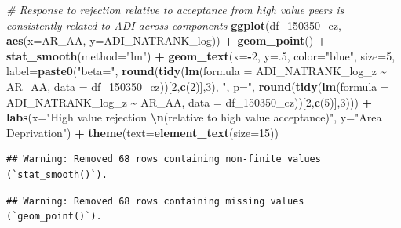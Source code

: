 \documentclass[
]{article}
\newenvironment{Shaded}{\begin{snugshade}}{\end{snugshade}}
\newcommand{\AttributeTok}[1]{\textcolor[rgb]{0.13,0.29,0.53}{#1}}
\newcommand{\CommentTok}[1]{\textcolor[rgb]{0.56,0.35,0.01}{\textit{#1}}}
\newcommand{\DecValTok}[1]{\textcolor[rgb]{0.00,0.00,0.81}{#1}}
\newcommand{\FunctionTok}[1]{\textcolor[rgb]{0.13,0.29,0.53}{\textbf{#1}}}
\newcommand{\NormalTok}[1]{#1}
\newcommand{\SpecialCharTok}[1]{\textcolor[rgb]{0.81,0.36,0.00}{\textbf{#1}}}
\newcommand{\StringTok}[1]{\textcolor[rgb]{0.31,0.60,0.02}{#1}}
\begin{document}
\begin{Shaded}
\begin{Highlighting}[]
\CommentTok{\# Response to rejection relative to acceptance from high value peers is consistently related to ADI across components}
\FunctionTok{ggplot}\NormalTok{(df\_150350\_cz, }\FunctionTok{aes}\NormalTok{(}\AttributeTok{x=}\NormalTok{AR\_AA, }\AttributeTok{y=}\NormalTok{ADI\_NATRANK\_log)) }\SpecialCharTok{+}
  \FunctionTok{geom\_point}\NormalTok{() }\SpecialCharTok{+}
  \FunctionTok{stat\_smooth}\NormalTok{(}\AttributeTok{method=}\StringTok{"lm"}\NormalTok{) }\SpecialCharTok{+}
  \FunctionTok{geom\_text}\NormalTok{(}\AttributeTok{x=}\SpecialCharTok{{-}}\DecValTok{2}\NormalTok{, }\AttributeTok{y=}\NormalTok{.}\DecValTok{5}\NormalTok{, }\AttributeTok{color=}\StringTok{"blue"}\NormalTok{, }\AttributeTok{size=}\DecValTok{5}\NormalTok{, }\AttributeTok{label=}\FunctionTok{paste0}\NormalTok{(}\StringTok{"beta="}\NormalTok{,}
       \FunctionTok{round}\NormalTok{(}\FunctionTok{tidy}\NormalTok{(}\FunctionTok{lm}\NormalTok{(}\AttributeTok{formula =}\NormalTok{ ADI\_NATRANK\_log\_z }\SpecialCharTok{\textasciitilde{}}\NormalTok{ AR\_AA, }\AttributeTok{data =}\NormalTok{ df\_150350\_cz))[}\DecValTok{2}\NormalTok{,}\FunctionTok{c}\NormalTok{(}\DecValTok{2}\NormalTok{)],}\DecValTok{3}\NormalTok{),}
       \StringTok{", p="}\NormalTok{, }
       \FunctionTok{round}\NormalTok{(}\FunctionTok{tidy}\NormalTok{(}\FunctionTok{lm}\NormalTok{(}\AttributeTok{formula =}\NormalTok{ ADI\_NATRANK\_log\_z }\SpecialCharTok{\textasciitilde{}}\NormalTok{ AR\_AA, }\AttributeTok{data =}\NormalTok{ df\_150350\_cz))[}\DecValTok{2}\NormalTok{,}\FunctionTok{c}\NormalTok{(}\DecValTok{5}\NormalTok{)],}\DecValTok{3}\NormalTok{))) }\SpecialCharTok{+}
  \FunctionTok{labs}\NormalTok{(}\AttributeTok{x=}\StringTok{"High value rejection }\SpecialCharTok{\textbackslash{}n}\StringTok{(relative to high value acceptance)"}\NormalTok{,}
       \AttributeTok{y=}\StringTok{"Area Deprivation"}\NormalTok{) }\SpecialCharTok{+}
  \FunctionTok{theme}\NormalTok{(}\AttributeTok{text=}\FunctionTok{element\_text}\NormalTok{(}\AttributeTok{size=}\DecValTok{15}\NormalTok{))}
\end{Highlighting}
\end{Shaded}

\begin{verbatim}
## Warning: Removed 68 rows containing non-finite values (`stat_smooth()`).
\end{verbatim}

\begin{verbatim}
## Warning: Removed 68 rows containing missing values (`geom_point()`).
\end{verbatim}
\end{document}
